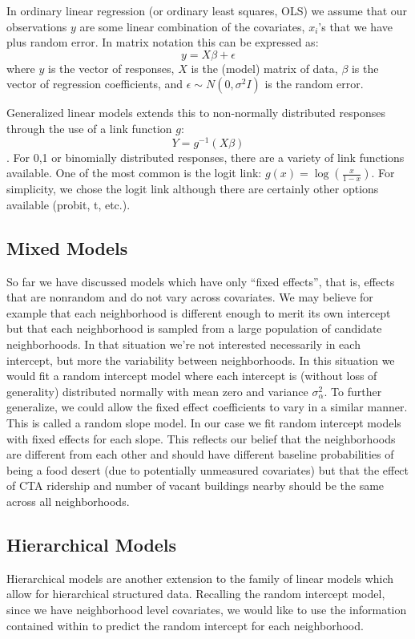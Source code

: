 \documentclass{report}
\begin{document}
In ordinary linear regression (or ordinary least squares, OLS) we assume that our observations $y$ are some linear combination of the covariates, $x_i$'s that we have plus random error. In matrix notation this can be expressed as: $$y = X\beta + \epsilon$$ where $y$ is the vector of responses, $X$ is the (model) matrix of data, $\beta$ is the vector of regression coefficients, and $\epsilon \sim N(0, \sigma^2 I)$ is the random error.

Generalized linear models extends this to non-normally distributed responses through the use of a link function $g$: $$Y = g^{-1}(X\beta)$$. For {0,1} or binomially distributed responses, there are a variety of link functions available. One of the most common is the logit link: $g(x) = \log(\frac{x}{1-x})$. For simplicity, we chose the logit link although there are certainly other options available (probit, t, etc.). 

\subsection*{Mixed Models}

So far we have discussed models which have only ``fixed effects'', that is, effects that are nonrandom and do not vary across covariates. We may believe for example that each neighborhood is different enough to merit its own intercept but that each neighborhood is sampled from a large population of candidate neighborhoods. In that situation we're not interested necessarily in each intercept, but more the variability between neighborhoods. In this situation we would fit a random intercept model where each intercept is (without loss of generality) distributed normally with mean zero and variance $\sigma^2_\alpha$.  To further generalize, we could allow the fixed effect coefficients to vary in a similar manner. This is called a random slope model. In our case we fit random intercept models with fixed effects for each slope. This reflects our belief that the neighborhoods are different from each other and should have different baseline probabilities of being a food desert (due to potentially unmeasured covariates) but that the effect of CTA ridership and number of vacant buildings nearby should be the same across all neighborhoods. 

\subsection*{Hierarchical Models}

Hierarchical models are another extension to the family of linear models which allow for hierarchical structured data. Recalling the random intercept model, since we have neighborhood level covariates, we would like to use the information contained within to predict the random intercept for each neighborhood. 
\end{document}
